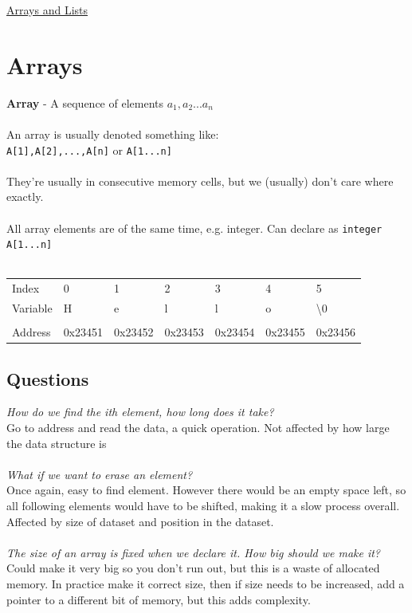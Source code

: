 \documentclass{article}[18pt]
\begin{document}
\begin{center}
\underline{\huge Arrays and Lists}
\end{center}
\section{Arrays}
\textbf{Array} - A sequence of elements $a_1, a_2 ... a_n$\\
\\
An array is usually denoted something like:\\
\texttt{A[1],A[2],...,A[n]} or \texttt{A[1...n]}\\
\\
They're usually in consecutive memory cells, but we (usually) don't care where exactly.\\
\\
All array elements are of the same time, e.g. integer. Can declare as \texttt{integer A[1...n]}\\
\\
\begin{tabular}{lllllll}
Index&0&1&2&3&4&5\\ \cline{2-7} 
\multicolumn{1}{l|}{Variable}&\multicolumn{1}{l|}{H}& \multicolumn{1}{l|}{e}& \multicolumn{1}{l|}{l}& \multicolumn{1}{l|}{l}& \multicolumn{1}{l|}{o}&\multicolumn{1}{l|}{\textbackslash 0} \\ \cline{2-7} 
&&&&&&\\ \cline{2-7} 
\multicolumn{1}{l|}{Address}&\multicolumn{1}{l|}{0x23451}&\multicolumn{1}{l|}{0x23452}&\multicolumn{1}{l|}{0x23453}&\multicolumn{1}{l|}{0x23454}&\multicolumn{1}{l|}{0x23455}&\multicolumn{1}{l|}{0x23456}\\ \cline{2-7} 
\end{tabular}
\subsection{Questions}
\textit{How do we find the ith element, how long does it take?}\\
Go to address and read the data, a quick operation. Not affected by how large the data structure is\\
\\
\textit{What if we want to erase an element?}\\
Once again, easy to find element. However there would be an empty space left, so all following elements would have to be shifted, making it a slow process overall. Affected by size of dataset and position in the dataset.\\
\\
\textit{The size of an array is fixed when we declare it. How big should we make it?}\\
Could make it very big so you don't run out, but this is a waste of allocated memory. In practice make it correct size, then if size needs to be increased, add a pointer to a different bit of memory, but this adds complexity.
\end{document}
